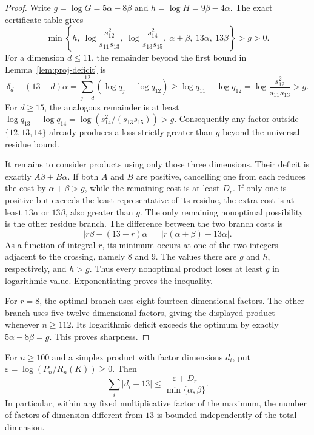 \begin{proof}
Write $g=\log G=5\alpha-8\beta$ and
$h=\log H=9\beta-4\alpha$. The exact certificate table gives
\begin{equation}\label{eq:proj-gap-comparisons}
 \min\left\{h,\ \log\frac{s_{12}^2}{s_{11}s_{13}},\
 \log\frac{s_{14}^2}{s_{13}s_{15}},\ \alpha+\beta,
 \ 13\alpha,\ 13\beta\right\}>g>0.
\end{equation}
For a dimension $d\le11$, the remainder beyond the first bound in
Lemma~\ref{lem:proj-deficit} is
\[
 \delta_d-(13-d)\alpha
 =\sum_{j=d}^{12}(\log q_j-\log q_{12})
 \ge\log q_{11}-\log q_{12}
 =\log\frac{s_{12}^2}{s_{11}s_{13}}>g.
\]
For $d\ge15$, the analogous remainder is at least
$\log q_{13}-\log q_{14}
=\log(s_{14}^2/(s_{13}s_{15}))>g$.
Consequently any factor outside $\{12,13,14\}$ already produces a
loss strictly greater than $g$ beyond the universal residue bound.

It remains to consider products using only those three dimensions.
Their deficit is exactly $A\beta+B\alpha$. If both $A$ and $B$ are
positive, cancelling one from each reduces the cost by
$\alpha+\beta>g$, while the remaining cost is at least $D_r$.
If only one is positive but exceeds the least representative of its
residue, the extra cost is at least $13\alpha$ or $13\beta$, also
greater than $g$. The only remaining nonoptimal possibility is the
other residue branch. The difference between the two branch costs is
\[
 |r\beta-(13-r)\alpha|
      =|r(\alpha+\beta)-13\alpha|.
\]
As a function of integral $r$, its minimum occurs at one of the two
integers adjacent to the crossing, namely $8$ and $9$. The values
there are $g$ and $h$, respectively, and $h>g$. Thus every nonoptimal
product loses at least $g$ in logarithmic value. Exponentiating proves
the inequality.

For $r=8$, the optimal branch uses eight fourteen-dimensional factors.
The other branch uses five twelve-dimensional factors, giving the
displayed product whenever $n\ge112$. Its logarithmic deficit exceeds
the optimum by exactly $5\alpha-8\beta=g$. This proves sharpness.
\end{proof}

\begin{corollary}
\label{cor:proj-stability}
For $n\ge100$ and a simplex product with factor dimensions $d_i$,
put $\varepsilon=\log(P_n/R_n(K))\ge0$. Then
\[
 \sum_i|d_i-13|\le
 \frac{\varepsilon+D_r}{\min\{\alpha,\beta\}}.
\]
In particular, within any fixed multiplicative factor of the maximum,
the number of factors of dimension different from $13$ is bounded
independently of the total dimension.
\end{corollary}

